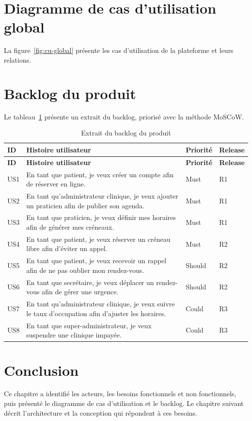 \section{Diagramme de cas d'utilisation global}
La figure~\ref{fig:cu-global} présente les cas d'utilisation de la plateforme et leurs relations.


\section{Backlog du produit}
Le tableau~\ref{tab:backlog} présente un extrait du backlog, priorisé avec la méthode MoSCoW.

\begin{longtable}{p{1cm}p{9.4cm}p{1.6cm}p{2cm}}
\caption{Extrait du backlog du produit}\label{tab:backlog}\\
\toprule
\textbf{ID} & \textbf{Histoire utilisateur} & \textbf{Priorité} & \textbf{Release} \\
\midrule
\endfirsthead
\toprule
\textbf{ID} & \textbf{Histoire utilisateur} & \textbf{Priorité} & \textbf{Release} \\
\midrule
\endhead
US1 & En tant que patient, je veux créer un compte afin de réserver en ligne. & Must & R1 \\
US2 & En tant qu'administrateur clinique, je veux ajouter un praticien afin de publier son agenda. & Must & R1 \\
US3 & En tant que praticien, je veux définir mes horaires afin de générer mes créneaux. & Must & R1 \\
US4 & En tant que patient, je veux réserver un créneau libre afin d'éviter un appel. & Must & R2 \\
US5 & En tant que patient, je veux recevoir un rappel afin de ne pas oublier mon rendez-vous. & Should & R2 \\
US6 & En tant que secrétaire, je veux déplacer un rendez-vous afin de gérer une urgence. & Should & R2 \\
US7 & En tant qu'administrateur clinique, je veux suivre le taux d'occupation afin d'ajuster les horaires. & Could & R3 \\
US8 & En tant que super-administrateur, je veux suspendre une clinique impayée. & Could & R3 \\
\bottomrule
\end{longtable}

\section*{Conclusion}
Ce chapitre a identifié les acteurs, les besoins fonctionnels et non fonctionnels, puis présenté le diagramme de cas d'utilisation et le backlog. Le chapitre suivant décrit l'architecture et la conception qui répondent à ces besoins.
